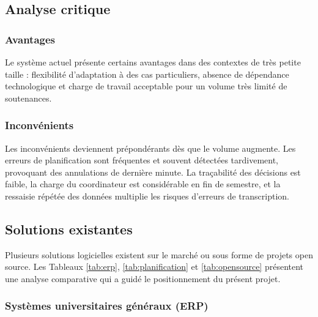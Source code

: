 \documentclass[12pt,a4paper]{article}
\begin{document}
\subsection{Analyse critique}
\label{subsec:analyse_critique}

\subsubsection{Avantages}
\label{subsubsec:avantages}

Le système actuel présente certains avantages dans des contextes de très petite
taille : flexibilité d'adaptation à des cas particuliers, absence de dépendance
technologique et charge de travail acceptable pour un volume très limité de
soutenances.

\subsubsection{Inconvénients}
\label{subsubsec:inconvenients}

Les inconvénients deviennent prépondérants dès que le volume augmente. Les
erreurs de planification sont fréquentes et souvent détectées tardivement,
provoquant des annulations de dernière minute. La traçabilité des décisions est
faible, la charge du coordinateur est considérable en fin de semestre, et la
ressaisie répétée des données multiplie les risques d'erreurs de transcription.

\subsection{Solutions existantes}
\label{subsec:solutions_existantes}

Plusieurs solutions logicielles existent sur le marché ou sous forme de projets
open source. Les Tableaux \ref{tab:erp}, \ref{tab:planification} et \ref{tab:opensource} présentent une
analyse comparative qui a guidé le positionnement du présent projet.

\subsubsection{Systèmes universitaires généraux (ERP)}
\label{subsubsec:erp}
\end{document}
